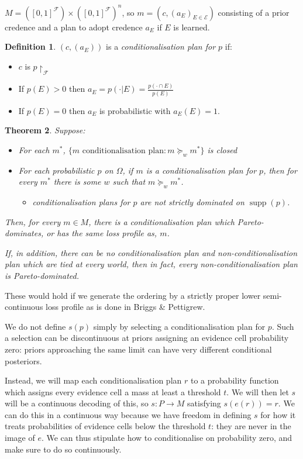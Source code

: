 \documentclass[11pt]{article}
\newtheorem{theorem}{Theorem}[section]
\theoremstyle{definition}
\newtheorem{definition}[theorem]{Definition}
\theoremstyle{remark}
\newcommand{\agenda}{\mathcal F}
\newcommand{\supp}{\operatorname{supp}}
\begin{document}
$M=([0,1]^{\agenda})\times ([0,1]^{\agenda})^n$, so 
$m=(c,(a_E)_{E\in\mathcal{E}})$ consisting of a prior credence and a plan to adopt credence $a_E$ if $E$ is learned.

\begin{definition}
	$(c,(a_E))$ is a \emph{conditionalisation plan for $p$} if:\begin{itemize}
		\item $c$ is $p\upharpoonright_\agenda$
		\item If $p(E)>0$ then $a_E=p(\cdot | E)=\frac{p(\cdot \cap E)}{p(E)}$
		\item If $p(E)=0$ then $a_E$ is probabilistic with $a_E(E)=1$. 
	\end{itemize}
\end{definition}
\begin{theorem}
	Suppose:
	\begin{itemize}
		\item For each $m^*$, $\{m \text{ conditionalisation plan} : m\succeq_w m^*\}$ is closed
		\item For each probabilistic $p$ on $\Omega$, if $m$ is a conditionalisation plan for $p$, then for every $m^*$ there is some $w$ such that $m\succeq_w m^*$. 
		\begin{itemize}
			\item conditionalisation plans for $p$ are not strictly dominated on $\supp(p)$. 
		\end{itemize}
	\end{itemize}
	
	Then, for every $m\in M$, there is a conditionalisation plan which Pareto-dominates, or has the same loss profile as, $m$. 
	
	If, in addition, there can be no conditionalisation plan and non-conditionalisation plan which are tied at every world, then in fact, every non-conditionalisation plan is Pareto-dominated. 
\end{theorem}
These would hold if we generate the ordering by a strictly proper lower semi-continuous loss profile as is done in Briggs \& Pettigrew. 

We do not define $s(p)$ simply by selecting a
conditionalisation plan for $p$. Such a selection
can be discontinuous at priors assigning an evidence
cell probability zero: priors approaching the same
limit can have very different conditional posteriors.

Instead, we will map each conditionalisation plan $r$ to a probability function which assigns every evidence cell a mass at least a threshold $t$. We will then let $s$ will be a continuous decoding of this, so $s\colon P\to M$ satisfying $s(e(r))=r$. We can do this in a continuous way because we have freedom in defining $s$ for how it treats probabilities of evidence cells below the threshold $t$: they are never in the image of $e$. We can thus stipulate how to conditionalise on probability zero, and make sure to do so continuously. 
\end{document}
